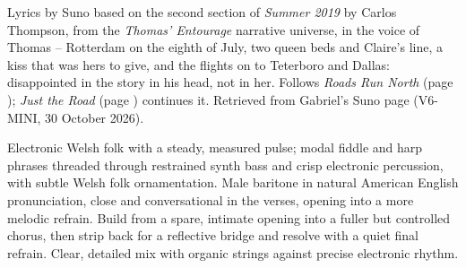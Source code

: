 
\label{sec:where-your-yes-begins}
\begin{notes}
Lyrics by Suno based on the second section of \emph{Summer 2019} by Carlos Thompson, from the \emph{Thomas' Entourage} narrative universe, in the voice of Thomas -- Rotterdam on the eighth of July, two queen beds and Claire's line, a kiss that was hers to give, and the flights on to Teterboro and Dallas: disappointed in the story in his head, not in her. Follows \emph{Roads Run North} (page \pageref{sec:roads-run-north}); \emph{Just the Road} (page \pageref{sec:just-the-road}) continues it. Retrieved from Gabriel's Suno page (V6-MINI, 30 October 2026).
\end{notes}
\begin{style}
Electronic Welsh folk with a steady, measured pulse; modal fiddle and harp phrases threaded through restrained synth bass and crisp electronic percussion, with subtle Welsh folk ornamentation. Male baritone in natural American English pronunciation, close and conversational in the verses, opening into a more melodic refrain. Build from a spare, intimate opening into a fuller but controlled chorus, then strip back for a reflective bridge and resolve with a quiet final refrain. Clear, detailed mix with organic strings against precise electronic rhythm.
\end{style}
